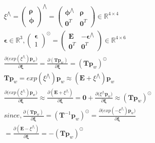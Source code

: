 \documentclass{article}
\begin{document}
\begin{CJK*}{GBK}{song}
\begin{equation}\left.\begin{aligned}
&
\xi^{\bigwedge}=
\begin{pmatrix}
\boldsymbol{\rho}\\\boldsymbol{\phi}
\end{pmatrix}^{\bigwedge}=
\begin{pmatrix}
\boldsymbol{\phi}^{\bigwedge}&\boldsymbol{\rho}
\\\textbf{0}^T&\textbf{0}^T
\end{pmatrix}\in{\mathbb{R}^{4\times{4}}}
\\&
\boldsymbol{\epsilon}\in{\mathbb{R}^3},
\begin{pmatrix}
\boldsymbol{\epsilon}\\1
\end{pmatrix}^{\odot}
=\begin{pmatrix}
\textbf{E}&-\boldsymbol{\epsilon}^{\bigwedge}\\\textbf{0}^T&\textbf{0}^T
\end{pmatrix}\in{\mathbb{R}^{4\times{6}}}
\\&
\frac{\partial{(exp(\xi^{\bigwedge})\textbf{p}_w})}{\partial{\boldsymbol{\xi}}} =
\frac{\partial{(\textbf{T}\textbf{p}_w)}}{\partial{\boldsymbol{\xi}}} = (\textbf{T}\textbf{p}_w)^{\odot}
\\&
\textbf{T}\textbf{p}_w=exp(\xi^{\bigwedge})\textbf{p}_w\approx(\textbf{E}+\xi^{\bigwedge})\textbf{p}_w
\\&
\frac{\partial{(exp(\xi^{\bigwedge})\textbf{p}_w})}{\partial{\boldsymbol{\xi}}}\approx
\frac{\partial{(\textbf{E}+\xi^{\bigwedge})}}{\partial{\boldsymbol{\xi}}}=
\textbf{0}+\frac{\partial{(\xi^{\bigwedge}\textbf{p}_w})}{\partial{\boldsymbol{\xi}}}\approx(\textbf{T}\textbf{p}_w)^{\odot}
\\&
since,\frac{\partial{(\textbf{T}\textbf{p}_w)}}{\partial{\boldsymbol{\xi}}} = (\textbf{T}^{-1}\textbf{p}_w)^{\odot}=
\frac{\partial{(exp(-\xi^{\bigwedge})\textbf{p}_w})}{\partial{\boldsymbol{\xi}}}
\\&
=\frac{\partial{(\textbf{E}-\xi^{\bigwedge})}}{\partial{\boldsymbol{\xi}}}=-(\textbf{T}\textbf{p}_w)^{\odot}
\end{aligned}\tag{2.2}\right.\end{equation}



\end{CJK*}
\end{document}
